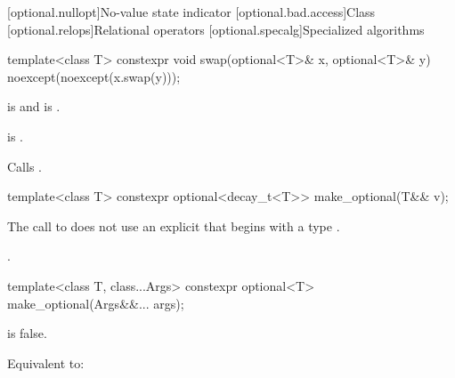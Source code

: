 [optional.nullopt]{No-value state indicator}
[optional.bad.access]{Class }
[optional.relops]{Relational operators}
[optional.specalg]{Specialized algorithms}
%
\begin{itemdecl}
template<class T>
  constexpr void swap(optional<T>& x, optional<T>& y) noexcept(noexcept(x.swap(y)));
\end{itemdecl}

\begin{itemdescr}
\pnum
\begin{removedblock}
\constraints
{} is  and
 is .
\end{removedblock}

\begin{addedblock}
  \constraints
     is .
\end{addedblock}

\pnum
\effects
Calls .
\end{itemdescr}


%
\begin{itemdecl}
template<class T> constexpr optional<decay_t<T>> make_optional(T&& v);
\end{itemdecl}

\begin{itemdescr}
\begin{addedblock}
\pnum
\constraints
The call to  does not use
an explicit  that
begins with a type .
\end{addedblock}

\pnum
\returns
{}.
\end{itemdescr}

%
\begin{itemdecl}
template<class T, class...Args>
  constexpr optional<T> make_optional(Args&&... args);
\end{itemdecl}

\begin{itemdescr}
\begin{addedblock}
\pnum
\mandates
{} is false.
\end{addedblock}

\pnum
\effects
Equivalent to: 
\end{itemdescr}

